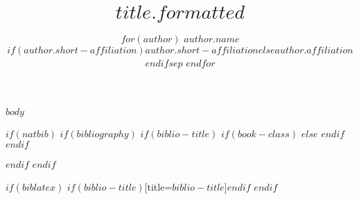 \documentclass[$if(documentclass)$$documentclass$$else$article$endif$$if(classoption)$,$classoption$$endif$]{jss}
\author{
$for(author)$
$author.name$\\
$if(author.short-affiliation)$$author.short-affiliation$$else$$author.affiliation$$endif$$sep$ \And 
$endfor$
}
\title{$title.formatted$}
\begin{document}
$body$

$if(natbib)$
$if(bibliography)$
$if(biblio-title)$
$if(book-class)$
\renewcommand\bibname{$biblio-title$}
$else$
\renewcommand\refname{$biblio-title$}
$endif$
$endif$

$endif$
$endif$

$if(biblatex)$
\printbibliography$if(biblio-title)$[title=$biblio-title$]$endif$
$endif$
\end{document}
